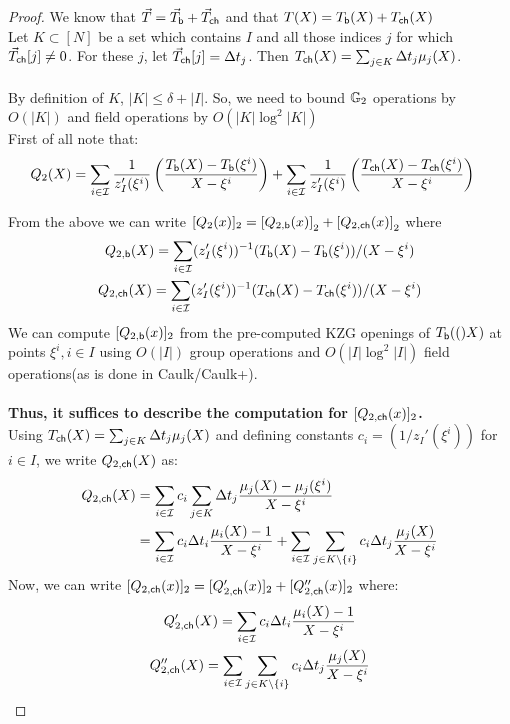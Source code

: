 \begin{proof}
    We know that $\vec{T}=\vec{T}_{\mathsf{b}}+\vec{T}_{\mathsf{ch}}$ and that $T(X)=T_{\mathsf{b}}({X})+T_{\mathsf{ch}}({X})$\\

    Let $K \subset [N]$ be a set which contains $I$ and all those indices $j$ for which $\vec{T}_{\mathsf{ch}}[j] \neq 0$. For these $j$, let $\vec{T}_{\mathsf{ch}}[j]=\Delta t_j$. Then $T_{\mathsf{ch}}({X})=\sum_{j\in K}\Delta t_j\mu_j(X)$.\\\\
    By definition of $K$, $|K|\leq \delta +|I|$. So, we need to bound $\mathbb{G}_2$ operations by $O(|K|)$ and field operations by $O(|K| \log^2|K|)$\\
    First of all note that:
    \begin{align}\label{eq:Q2-upd}
    Q_2(X) &= \sum_{i\in \mathcal{I}}\frac{1}{z_I'(\xi^i)}\left(\frac{T_{\mathsf{b}}({X}) - T_{\mathsf{b}}({\xi^i})}{X-\xi^i}\right)
    + \sum_{i\in \mathcal{I}}\frac{1}{z_I'(\xi^i)}\left(\frac{T_{\mathsf{ch}}({X}) - T_{\mathsf{ch}}({\xi^i})}{X-\xi^i}\right)
    \end{align}

    From the above we can write $[Q_2(x)]_2=\left[{Q_{2,\mathsf{b}}({x})}\right]_2+\left[{Q_{2,\mathsf{ch}}({x})}\right]_2$ where
    \begin{gather*}
        Q_{2,\mathsf{b}}({X})=\sum_{i\in \mathcal{I}}(z_I'(\xi^i))^{-1} (T_{\mathsf{b}}({X})-T_{\mathsf{b}}({\xi^i}))/(X-\xi^i) \\
        Q_{2,\mathsf{ch}}({X})=\sum_{i\in \mathcal{I}}(z_I'(\xi^i))^{-1} (T_{\mathsf{ch}}({X})-T_{\mathsf{ch}}({\xi^i}))/(X-\xi^i)
    \end{gather*}
    We can compute
    $[Q_{2,\mathsf{b}}({x})]_2$ from the pre-computed KZG openings of $T_{\mathsf{b}}({(})X)$ at points $\xi^i,i\in I$ using $O(|I|)$ group operations and
    $O(|I|\log^2 |I|)$ field operations(as is done in Caulk/Caulk+).\\\\

    \textbf{Thus, it suffices to describe the computation for $[Q_{2,\mathsf{ch}}({x})]_2$. }\\
    Using
    $T_{\mathsf{ch}}({X})=\sum_{j\in K}\Delta t_j\mu_j(X)$ and defining constants $c_i=(1/z_I'(\xi^i))$ for $i\in I$,
    we write $Q_{2,\mathsf{ch}}({X})$ as:
    \begin{align*}
        Q_{2,\mathsf{ch}}({X}) &= \sum_{i\in \mathcal{I}} c_i\sum_{j\in K} \Delta t_j\frac{\mu_j(X)-\mu_j(\xi^i)}{X-\xi^i} \\
        &= \sum_{i\in \mathcal{I}} c_i\Delta t_i\frac{\mu_i(X) - 1}{X-\xi^i} + \sum_{i\in \mathcal{I}}\sum_{j\in K\setminus\{i\}}c_i\Delta t_j\frac{\mu_j(X)}{X-\xi^i}
    \end{align*}
    Now, we can write $[Q_{2,\mathsf{ch}}({x})]_2=[Q'_{2,\mathsf{ch}}({x})]_2 + [Q''_{2,\mathsf{ch}}({x})]_2$ where:
    \begin{gather*}
        Q'_{2,\mathsf{ch}}({X})=\sum_{i\in \mathcal{I}}c_i\Delta t_i\frac{\mu_i(X)-1}{X-\xi^i} \\
        Q''_{2,\mathsf{ch}}({X})=\sum_{i\in \mathcal{I}}\sum_{j\in K\setminus \{i\}} c_i\Delta t_j\frac{\mu_j(X)}{X-\xi^i}
    \end{gather*}


\end{proof}
